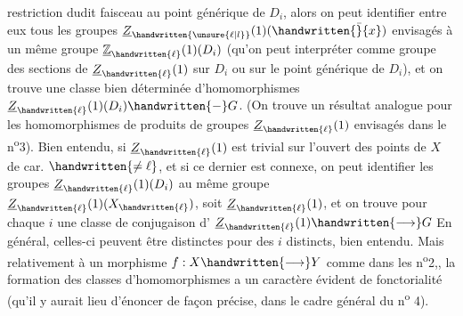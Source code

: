 
restriction dudit faisceau au  point générique de $D_i$, alors on peut identifier entre eux tous les groupes $\underline{Z}_{\handwritten{\unsure{\ell|l}}}(1)(\handwritten{\bar}{x})$ envisagés à un même groupe $\underline{\mathbb{Z}}_{\handwritten{\ell}}(1)(D_i)$ (qu'on peut interpréter comme groupe des sections de $\underline{Z}_{\handwritten{\ell}}(1)$ sur $D_i$ ou sur le point générique de $D_i$), et on trouve une classe  bien déterminée d'homomorphismes $\underline{Z}_{\handwritten{\ell}}(1)(D_i)\handwritten{\mathbin{-}}G$. (On trouve un résultat analogue pour les homomorphismes de produits de groupes $\underline{Z}_{\handwritten{\ell}}(1)$ envisagés dans le n\textsuperscript{o}3). Bien entendu, si $\underline{Z}_{\handwritten{\ell}}(1)$ est trivial sur l'ouvert des points de $X$  de car. $\handwritten{\ne\ell}$, et si ce dernier est connexe, on peut identifier les groupes $\underline{Z}_{\handwritten{\ell}}(1)(D_i)$ au même groupe  $\underline{Z}_{\handwritten{\ell}}(1)(X_{\handwritten{\ell}})$,  soit $\underline{Z}_{\handwritten{\ell}}(1)$, et on trouve  pour chaque $i$ une classe de conjugaison d' $\underline{Z}_{\handwritten{\ell}}(1)\handwritten{\longrightarrow}G$ En général, celles-ci  peuvent être distinctes pour des $i$ distincts, bien entendu. Mais relativement à un morphisme $f:X\handwritten{\longrightarrow}Y$ comme dans les n\textsuperscript{o}2,, la formation des classes  d'homomorphismes a un caractère évident de fonctorialité (qu'il y aurait lieu d'énoncer de façon précise, dans le cadre général du n\textsuperscript{o} 4).


